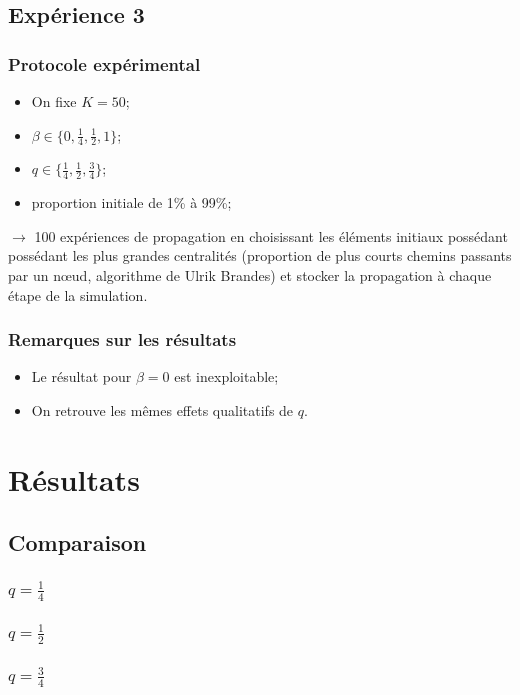 \documentclass{beamer}
\newcommand{\resultat}[1]{
  \fontsize{8}{10}\selectfont
  \begin{center}
  
  \end{center}
}
\begin{document}
\subsection{Expérience 3}
\begin{frame}
  \frametitle{Protocole expérimental}
  \begin{itemize}
    \item On fixe $K=50$;
    \item $\beta \in \{0,\frac{1}{4},\frac{1}{2},1\}$;
    \item $q\in \{\frac{1}{4}, \frac{1}{2}, \frac{3}{4}\}$;
    \item proportion initiale de 1\% à 99\%;
  \end{itemize}
  $\rightarrow$ 100 expériences de propagation en choisissant les éléments initiaux possédant possédant les plus grandes centralités (proportion de plus courts chemins passants par un nœud, algorithme de Ulrik Brandes) et stocker la propagation à chaque étape de la simulation.
\end{frame}
\begin{frame}
  \frametitle{Remarques sur les résultats}
  \begin{itemize}
    \item<1-> Le résultat pour $\beta=0$ est inexploitable;
    \item<2-> On retrouve les mêmes effets qualitatifs de $q$.
  \end{itemize}
\end{frame}

\section{Résultats}
\subsection{Comparaison}
\begin{frame}
  \frametitle{$q = \frac{1}{4}$}
  \resultat{all_finale_f_initiale_q25_pres}
\end{frame}

\begin{frame}
  \frametitle{$q = \frac{1}{2}$}
  \resultat{all_finale_f_initiale_q50_pres}
\end{frame}

\begin{frame}
  \frametitle{$q = \frac{3}{4}$}
  \resultat{all_finale_f_initiale_q75_pres}
\end{frame}
\end{document}
